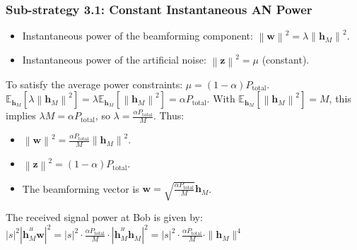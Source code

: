 \documentclass[10pt,a4paper]{article} %
\newcommand{\norm}[1]{\left\| #1 \right\|}
\newcommand{\herm}{^H} %
\newcommand{\E}{\mathbb{E}} %
\begin{document}
\subsubsection{Sub-strategy 3.1: Constant Instantaneous AN Power}
\begin{itemize}
    \item Instantaneous power of the beamforming component: $\norm{\mathbf{w}}^2 = \lambda \norm{\mathbf{h}_M}^2$.
    \item Instantaneous power of the artificial noise: $\norm{\mathbf{z}}^2 = \mu$ (constant).
\end{itemize}
To satisfy the average power constraints:
$\mu = (1-\alpha)P_{\text{total}}$.
$\E_{\mathbf{h}_M}[\lambda \norm{\mathbf{h}_M}^2] = \lambda \E_{\mathbf{h}_M}[\norm{\mathbf{h}_M}^2] = \alpha P_{\text{total}}$. With $\E_{\mathbf{h}_M}[\norm{\mathbf{h}_M}^2] = M$, this implies $\lambda M = \alpha P_{\text{total}}$, so $\lambda = \frac{\alpha P_{\text{total}}}{M}$.
Thus:
\begin{itemize}
    \item $\norm{\mathbf{w}}^2 = \frac{\alpha P_{\text{total}}}{M} \norm{\mathbf{h}_M}^2$.
    \item $\norm{\mathbf{z}}^2 = (1-\alpha)P_{\text{total}}$.
    \item The beamforming vector is $\mathbf{w} = \sqrt{\frac{\alpha P_{\text{total}}}{M}} \mathbf{h}_M$.
\end{itemize}
The received signal power at Bob is given by: $|s|^2 \left| \mathbf{h}_M^{\herm} \mathbf{w} \right|^2 = |s|^2 \cdot \frac{\alpha P_{\text{total}}}{M} \cdot \left| \mathbf{h}_M^{\herm} \mathbf{h}_M \right|^2 = |s|^2 \cdot \frac{\alpha P_{\text{total}}}{M} \cdot \| \mathbf{h}_M \|^4$
\end{document}
